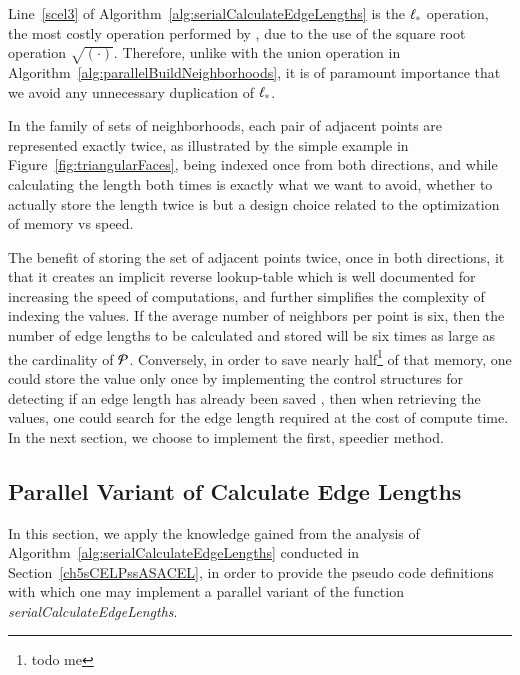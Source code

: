 Line~\ref{scel3} of Algorithm~\ref{alg:serialCalculateEdgeLengths} is the $\ell_\ast$ operation, the most costly operation performed by , due to the use of the square root operation $\sqrt{(\cdot)}$. Therefore, unlike with the union operation in Algorithm~\ref{alg:parallelBuildNeighborhoods}, it is of paramount importance that we avoid any unnecessary duplication of $\ell_\ast$.

In the family of sets of neighborhoods, each pair of adjacent points are represented exactly twice, as illustrated by the simple example in Figure~\ref{fig:triangularFaces}, being indexed once from both directions, and while calculating the length both times is exactly what we want to avoid, whether to actually store the length twice is but a design choice related to the optimization of memory vs speed.

The benefit of storing the set of adjacent points twice, once in both directions, it that it creates an implicit reverse lookup-table which is well documented for increasing the speed of computations, and further simplifies the complexity of indexing the values. If the average number of neighbors per point is six, then the number of edge lengths to be calculated and stored will be six times as large as the cardinality of $\mathcal{P}$. Conversely, in order to save nearly half\footnote{todo me} of that memory, one could store the value only once by implementing the control structures for detecting if an edge length has already been saved , then when retrieving the values, one could search for the edge length required at the cost of compute time. In the next section, we choose to implement the first, speedier method.

%
%
\subsection{Parallel Variant of Calculate Edge Lengths}
\label{ch5sCELPssPVCEL}
In this section, we apply the knowledge gained from the analysis of Algorithm~\ref{alg:serialCalculateEdgeLengths} conducted in Section~\ref{ch5sCELPssASACEL}, in order to provide the pseudo code definitions with which one may implement a parallel variant of the function \textit{serialCalculateEdgeLengths}.

